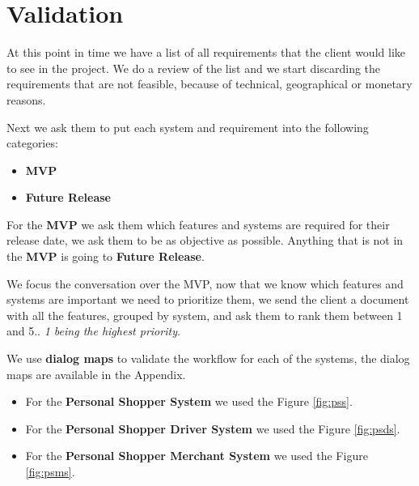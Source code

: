 \section{Validation }
At this point in time we have a list of all requirements that the client would 
like to see in the project. We do a review of the list and we start discarding 
the requirements that are not feasible, because of technical, geographical or 
monetary reasons. \newline

\noindent Next we ask them to put each system and requirement into the 
following categories:
\begin{itemize}
    \item \textbf{MVP} \cite{mvp}
    \item \textbf{Future Release}
\end{itemize}

\noindent For the \textbf{MVP} we ask them which features and systems are 
required for their release date, we ask them to be as objective as possible. 
Anything that is not in the \textbf{MVP} is going to 
\textbf{Future Release}. \newline

\noindent We focus the conversation over the MVP, now that we know which 
features and systems are important we need to prioritize them,  we send the 
client a document with all the features, grouped by system, and ask them to 
rank them between 1 and 5.. \textit{1 being the highest priority}. \newline

\noindent We use \textbf{dialog maps} to validate the workflow for each of 
the systems, the dialog maps are available in the Appendix. 
\begin{itemize}
    \item For the \textbf{Personal Shopper System} we used 
    the Figure \ref{fig:pss}. 
    \item For the \textbf{Personal Shopper Driver System} we used 
    the Figure \ref{fig:psds}. 
    \item For the \textbf{Personal Shopper Merchant System} we used 
    the Figure \ref{fig:psms}. 
\end{itemize}
